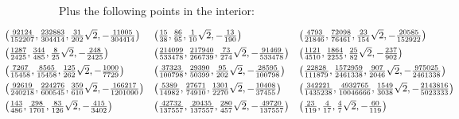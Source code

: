 \documentclass[reqno]{amsart}
\renewcommand{\:}{\colon}
\theoremstyle{definition}
\begin{document}
Plus the following points in the interior:
{\tiny \[ \hspace{-6em} \renewcommand{\arraystretch}{1.5} \begin{array}{lll}
 \left(\tfrac{92124}{152207},\tfrac{232883}{304414},\tfrac{31}{202}\sqrt{2},-\tfrac{11005}{304414}\right)  &
 \left(\tfrac{15}{38},\tfrac{86}{95},\tfrac{1}{10}\sqrt{2},-\tfrac{13}{190}\right)  &
 \left(\tfrac{4793}{21846},\tfrac{72098}{76461},\tfrac{23}{154}\sqrt{2},-\tfrac{20585}{152922}\right)  \\
 \left(\tfrac{1287}{2425},\tfrac{344}{485},\tfrac{8}{25}\sqrt{2},-\tfrac{248}{2425}\right)  &
 \left(\tfrac{214099}{533478},\tfrac{217940}{266739},\tfrac{73}{274}\sqrt{2},-\tfrac{91469}{533478}\right)  &
 \left(\tfrac{1121}{4510},\tfrac{1864}{2255},\tfrac{25}{82}\sqrt{2},-\tfrac{237}{902}\right)  \\
 \left(\tfrac{7267}{15458},\tfrac{8565}{15458},\tfrac{125}{262}\sqrt{2},-\tfrac{1000}{7729}\right)  &
 \left(\tfrac{37323}{100798},\tfrac{29390}{50399},\tfrac{95}{202}\sqrt{2},-\tfrac{28595}{100798}\right)  &
 \left(\tfrac{22828}{111879},\tfrac{1572959}{2461338},\tfrac{907}{2046}\sqrt{2},-\tfrac{975025}{2461338}\right)  \\
 \left(\tfrac{92619}{240218},\tfrac{224276}{600545},\tfrac{359}{610}\sqrt{2},-\tfrac{166217}{1201090}\right)  &
 \left(\tfrac{5389}{14982},\tfrac{27671}{74910},\tfrac{1301}{2270}\sqrt{2},-\tfrac{10408}{37455}\right)  &
 \left(\tfrac{342221}{1435238},\tfrac{4932765}{10046666},\tfrac{1549}{3038}\sqrt{2},-\tfrac{2143816}{5023333}\right)  \\
 \left(\tfrac{143}{486},\tfrac{298}{1701},\tfrac{83}{126}\sqrt{2},-\tfrac{415}{3402}\right)  &
 \left(\tfrac{42732}{137557},\tfrac{20435}{137557},\tfrac{280}{457}\sqrt{2},-\tfrac{49720}{137557}\right)  &
 \left(\tfrac{23}{119},\tfrac{4}{17},\tfrac{4}{7}\sqrt{2},-\tfrac{60}{119}\right)
\end{array} \]}
\end{document}

